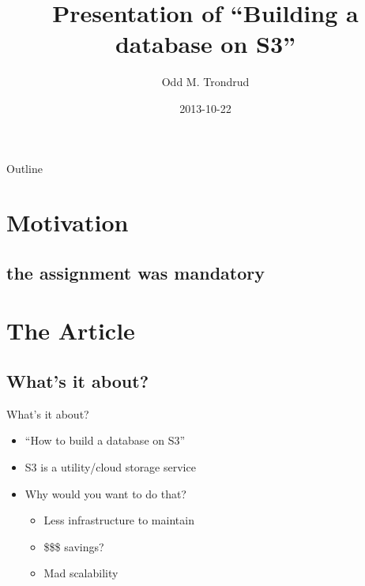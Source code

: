 \documentclass{beamer}
\title[Building a database on S3] %
{Presentation of ``Building a database on S3''}
\author[Odd M. Trondrud]{Odd M. Trondrud}
\institute[Norwegian University of Technology and Science] 
{
  Presentation of seminar article\\
  TDT4150 ``Avanserte Databasesystemer''\\
  autumn semester of 2013\\
  NTNU
}
\date[]
{2013-10-22}
\begin{document}
\begin{frame}
  \titlepage
\end{frame}

\begin{frame}{Outline}
  \tableofcontents
\end{frame}



\section{Motivation}

\subsection{the assignment was mandatory}

\section{The Article}
  \subsection{What's it about?}
    \begin{frame}{What's it about?}
      \begin{itemize}
      \item
        ``How to build a database on S3''
      \item
        S3 is a utility/cloud storage service
      \item
        Why would you want to do that?
        \begin{itemize}
        \item
          Less infrastructure to maintain
        \item
          \$\$\$ savings?
        \item
          Mad scalability
        \end{itemize}
      \end{itemize}
    \end{frame}
\end{document}
